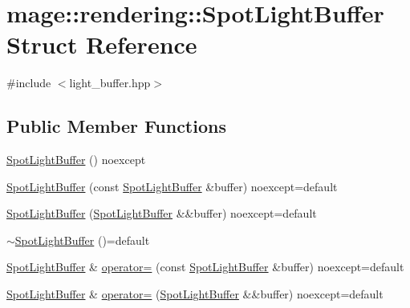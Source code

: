 \hypertarget{structmage_1_1rendering_1_1_spot_light_buffer}{}\section{mage\+:\+:rendering\+:\+:Spot\+Light\+Buffer Struct Reference}
\label{structmage_1_1rendering_1_1_spot_light_buffer}


{\ttfamily \#include $<$light\+\_\+buffer.\+hpp$>$}

\subsection*{Public Member Functions}
\begin{DoxyCompactItemize}
\item 
\mbox{\hyperlink{structmage_1_1rendering_1_1_spot_light_buffer_a603e2c40ae924a2183f24604297715aa}{Spot\+Light\+Buffer}} () noexcept
\item 
\mbox{\hyperlink{structmage_1_1rendering_1_1_spot_light_buffer_a091924b026f081f1612138806ff1e107}{Spot\+Light\+Buffer}} (const \mbox{\hyperlink{structmage_1_1rendering_1_1_spot_light_buffer}{Spot\+Light\+Buffer}} \&buffer) noexcept=default
\item 
\mbox{\hyperlink{structmage_1_1rendering_1_1_spot_light_buffer_a36fe774118a2b1d0e48ba89e74d09886}{Spot\+Light\+Buffer}} (\mbox{\hyperlink{structmage_1_1rendering_1_1_spot_light_buffer}{Spot\+Light\+Buffer}} \&\&buffer) noexcept=default
\item 
\mbox{\hyperlink{structmage_1_1rendering_1_1_spot_light_buffer_ab1fecb64be60d395b0bc5d3e6cc4072a}{$\sim$\+Spot\+Light\+Buffer}} ()=default
\item 
\mbox{\hyperlink{structmage_1_1rendering_1_1_spot_light_buffer}{Spot\+Light\+Buffer}} \& \mbox{\hyperlink{structmage_1_1rendering_1_1_spot_light_buffer_a6bfd4e7dc9b8a7d3cd5206c9becb91cf}{operator=}} (const \mbox{\hyperlink{structmage_1_1rendering_1_1_spot_light_buffer}{Spot\+Light\+Buffer}} \&buffer) noexcept=default
\item 
\mbox{\hyperlink{structmage_1_1rendering_1_1_spot_light_buffer}{Spot\+Light\+Buffer}} \& \mbox{\hyperlink{structmage_1_1rendering_1_1_spot_light_buffer_ab3d50a0d08d284577b0e43b05c34e287}{operator=}} (\mbox{\hyperlink{structmage_1_1rendering_1_1_spot_light_buffer}{Spot\+Light\+Buffer}} \&\&buffer) noexcept=default
\end{DoxyCompactItemize}
